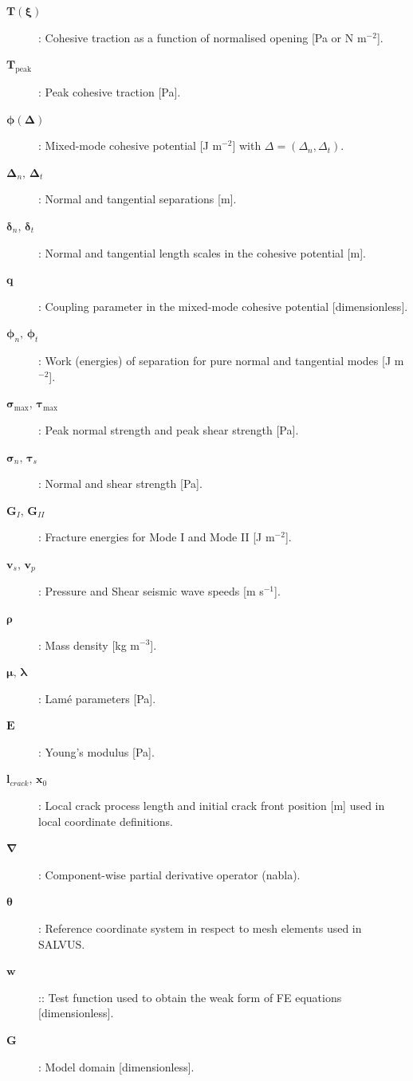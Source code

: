 \documentclass[10pt]{article}
\begin{document}
\begin{description}
  \item[$\boldsymbol{T}(\boldsymbol{\xi})$]: Cohesive traction as a function of normalised opening [Pa or N m$^{-2}$].
  \item[$\boldsymbol{T}_{\mathrm{peak}}$]: Peak cohesive traction [Pa].
  \item[$\boldsymbol{\phi}(\boldsymbol{\Delta})$]: Mixed-mode cohesive potential [J m$^{-2}$] with $\Delta=(\Delta_n,\Delta_t)$.
  \item[$\boldsymbol{\Delta}_n,\,\boldsymbol{\Delta}_t$]: Normal and tangential separations [m].
  \item[$\boldsymbol{\delta}_n,\,\boldsymbol{\delta}_t$]: Normal and tangential length scales in the cohesive potential [m].
  \item[$\boldsymbol{q}$]: Coupling parameter in the mixed-mode cohesive potential [dimensionless].
  \item[$\boldsymbol{\phi}_n,\,\boldsymbol{\phi}_t$]: Work (energies) of separation for pure normal and tangential modes [J m$^{-2}$].
  \item[$\boldsymbol{\sigma}_{\max},\,\boldsymbol{\tau}_{\max}$]: Peak normal strength and peak shear strength [Pa]. 
  \item[$\boldsymbol{\sigma}_n,\,\boldsymbol{\tau}_s$]: Normal and shear strength [Pa].
  \item[$\boldsymbol{G}_I,\,\boldsymbol{G}_{II}$]: Fracture energies for Mode I and Mode II [J m$^{-2}$].
  \item[$\boldsymbol{v}_s,\,\boldsymbol{v}_p$]: Pressure and Shear seismic wave speeds [m s$^{-1}$].
  \item[$\boldsymbol{\rho}$]: Mass density [kg m$^{-3}$].
  \item[$\boldsymbol{\mu},\,\boldsymbol{\lambda}$]: Lamé parameters [Pa].
  \item[$\boldsymbol{E}$]: Young's modulus [Pa].
  \item[$\boldsymbol{l}_{crack},\,\boldsymbol{x}_0$]: Local crack process length and initial crack front position [m] used in local coordinate definitions.
  \item[$\boldsymbol{\nabla}$]: Component-wise partial derivative operator (nabla). 
  \item[$\boldsymbol{\theta}$]: Reference coordinate system in respect to mesh elements used in SALVUS. 
  \item[$\boldsymbol{w}$]:: Test function used to obtain the weak form of FE equations [dimensionless]. 
  \item[$\boldsymbol{G}$]: Model domain [dimensionless]. 

\end{description}
\end{document}
